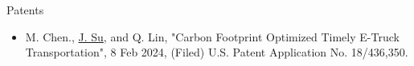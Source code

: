 \documentclass{resume} %
\begin{document}
\begin{rSection}{Patents}
    \begin{itemize}
        \item M. Chen., \underline{J. Su}, and Q. Lin, "Carbon Footprint Optimized Timely E-Truck Transportation", 8 Feb 2024, (Filed) U.S. Patent Application No. 18/436,350.
    \end{itemize}
\end{rSection}


\end{document}
